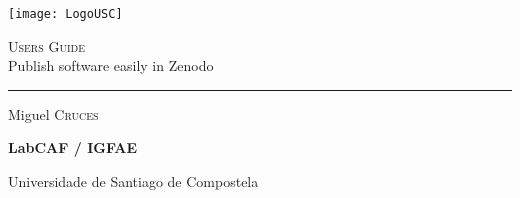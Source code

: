 
\begin{centering}
    \begin{minipage}[c]{0.4\linewidth}
        \centering
    \texttt{[image: LogoUSC]}
    \end{minipage}
    
    	\vspace{1.5cm}
        {\huge \textsc{Users Guide} \\ Publish software easily in Zenodo\par}
    	\vspace{0.25cm}
    
    	
    	\noindent\rule{\textwidth}{1pt}
    	\vspace{0.5cm}
        
        Miguel \textsc{Cruces}
    	
    	\vspace{0.5cm}
    	{\large\bfseries LabCAF / IGFAE  \par Universidade de Santiago de Compostela}
    
    	\vspace{1cm}
\end{centering}
